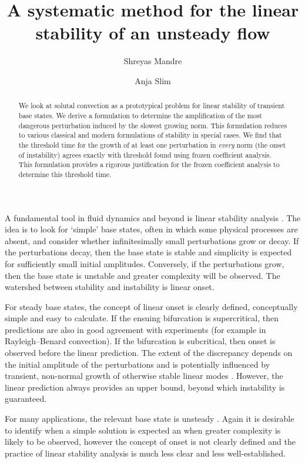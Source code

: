 \documentclass[letterpaper,prl,aps,twocolumn,reprint,superscriptaddress]{revtex4-1}
\begin{document}
\title{A systematic method for the linear stability of an unsteady flow}
\author{Shreyas Mandre}
\author{Anja Slim}
\begin{abstract}
We look at solutal convection as a prototypical problem for linear stability of transient base states. 
We derive a formulation to determine the amplification of the most dangerous perturbation induced by the slowest growing norm. 
This formulation reduces to various classical and modern formulations of stability in special cases. 
We find that the threshold time for the growth of at least one perturbation in {\em every} norm (the onset of instability) agrees exactly with threshold found using frozen coefficient analysis. 
This formulation provides a rigorous justification for the frozen coefficient analysis to determine this threshold time.
\end{abstract}
\maketitle


A fundamental tool in fluid dynamics and beyond is linear stability analysis \cite{DrazinReid}.  The idea is to look for `simple' base states, often in which some physical processes are absent, and consider whether infinitesimally small perturbations grow or decay.  If the perturbations decay, then the base state is stable and simplicity is expected for sufficiently small initial amplitudes.  Conversely, if the perturbations grow, then the base state is unstable and greater complexity will be observed.  The watershed between stability and instability is linear onset.  

For steady base states, the concept of linear onset is clearly defined, conceptually simple and easy to calculate.  If the ensuing bifurcation is supercritical, then predictions are also in good agreement with experiments (for example in Rayleigh--Benard convection).  If the bifurcation is subcritical, then onset is observed before the linear prediction.   The extent of the discrepancy depends on the initial amplitude of the perturbations and is potentially influenced by transient, non-normal growth of otherwise stable linear modes \cite{Trefethen}.  However, the linear prediction always provides an upper bound, beyond which instability is guaranteed.  

For many applications, the relevant base state is unsteady \cite{brouillette2002richtmyer,anderson2010foam,homsy1987viscous,thorpe1968method,MORE}.  Again it is desirable to identify when a simple solution is expected an when greater complexity is likely to be observed, however the concept of onset is not clearly defined and the practice of linear stability analysis is much less clear and less well-established.  
\end{document}
